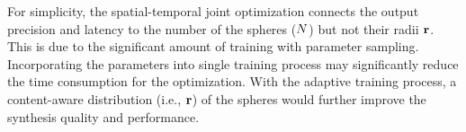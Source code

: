 For simplicity, the spatial-temporal joint optimization connects the output precision and latency to the number of the spheres ($N$) but not their radii $\mathbf{r}$. This is due to the significant amount of training with parameter sampling. Incorporating the parameters into single training process may significantly reduce the time consumption for the optimization. With the adaptive training process, a content-aware distribution (i.e., $\mathbf{r}$) of the spheres would further improve the synthesis quality and performance.
